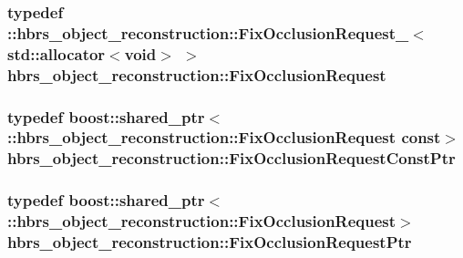 \hypertarget{namespacehbrs__object__reconstruction_a330d61c8057fd73ec5628a35f255636b}{
\subsubsection[{\-Fix\-Occlusion\-Request}]{\setlength{\rightskip}{0pt plus 5cm}typedef \-::{\bf hbrs\-\_\-object\-\_\-reconstruction\-::\-Fix\-Occlusion\-Request\-\_\-}$<$std\-::allocator$<$void$>$ $>$ {\bf hbrs\-\_\-object\-\_\-reconstruction\-::\-Fix\-Occlusion\-Request}}}\label{namespacehbrs__object__reconstruction_a330d61c8057fd73ec5628a35f255636b}
\hypertarget{namespacehbrs__object__reconstruction_ad613ea2a9d09686470fcaf0c9b18ddf9}{
\subsubsection[{\-Fix\-Occlusion\-Request\-Const\-Ptr}]{\setlength{\rightskip}{0pt plus 5cm}typedef boost\-::shared\-\_\-ptr$<$ \-::{\bf hbrs\-\_\-object\-\_\-reconstruction\-::\-Fix\-Occlusion\-Request} const$>$ {\bf hbrs\-\_\-object\-\_\-reconstruction\-::\-Fix\-Occlusion\-Request\-Const\-Ptr}}}\label{namespacehbrs__object__reconstruction_ad613ea2a9d09686470fcaf0c9b18ddf9}
\hypertarget{namespacehbrs__object__reconstruction_a27eef65a425f0684b700e2415dc6e8b7}{
\subsubsection[{\-Fix\-Occlusion\-Request\-Ptr}]{\setlength{\rightskip}{0pt plus 5cm}typedef boost\-::shared\-\_\-ptr$<$ \-::{\bf hbrs\-\_\-object\-\_\-reconstruction\-::\-Fix\-Occlusion\-Request}$>$ {\bf hbrs\-\_\-object\-\_\-reconstruction\-::\-Fix\-Occlusion\-Request\-Ptr}}}\label{namespacehbrs__object__reconstruction_a27eef65a425f0684b700e2415dc6e8b7}
